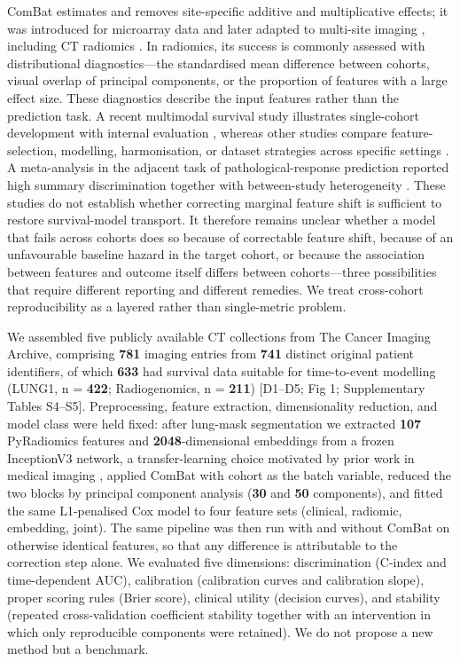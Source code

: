 \documentclass[a4paper,fleqn]{cas-sc}
\begin{document}
ComBat estimates and removes site-specific additive and multiplicative effects; it was introduced for microarray data \citep{johnson2007} and later adapted to multi-site imaging \citep{fortin2018}, including CT radiomics \citep{daano2020,mahon2020,bertolini2022,horng2022,cromb2020}. In radiomics, its success is commonly assessed with distributional diagnostics---the standardised mean difference between cohorts, visual overlap of principal components, or the proportion of features with a large effect size. These diagnostics describe the input features rather than the prediction task. A recent multimodal survival study illustrates single-cohort development with internal evaluation \citep{sahin2026}, whereas other studies compare feature-selection, modelling, harmonisation, or dataset strategies across specific settings \citep{amini2022,ge2023,le2023,chen2022,wang2022,wang2022b}. A meta-analysis in the adjacent task of pathological-response prediction reported high summary discrimination together with between-study heterogeneity \citep{jiang2026}. These studies do not establish whether correcting marginal feature shift is sufficient to restore survival-model transport. It therefore remains unclear whether a model that fails across cohorts does so because of correctable feature shift, because of an unfavourable baseline hazard in the target cohort, or because the association between features and outcome itself differs between cohorts---three possibilities that require different reporting and different remedies. We treat cross-cohort reproducibility as a layered rather than single-metric problem.

We assembled five publicly available CT collections from The Cancer Imaging Archive, comprising \textbf{781} imaging entries from \textbf{741} distinct original patient identifiers, of which \textbf{633} had survival data suitable for time-to-event modelling (LUNG1, n = \textbf{422}; Radiogenomics, n = \textbf{211}) [D1--D5; Fig 1; Supplementary Tables S4--S5]. Preprocessing, feature extraction, dimensionality reduction, and model class were held fixed: after lung-mask segmentation we extracted \textbf{107} PyRadiomics features \citep{vangriethuysen2017} and \textbf{2048}-dimensional embeddings from a frozen InceptionV3 network, a transfer-learning choice motivated by prior work in medical imaging \citep{zhou2021,niu2021,tariq2024,gao2025}, applied ComBat with cohort as the batch variable, reduced the two blocks by principal component analysis (\textbf{30} and \textbf{50} components), and fitted the same L1-penalised Cox model to four feature sets (clinical, radiomic, embedding, joint). The same pipeline was then run with and without ComBat on otherwise identical features, so that any difference is attributable to the correction step alone. We evaluated five dimensions: discrimination (C-index and time-dependent AUC), calibration (calibration curves and calibration slope), proper scoring rules (Brier score), clinical utility (decision curves), and stability (repeated cross-validation coefficient stability together with an intervention in which only reproducible components were retained). We do not propose a new method but a benchmark.
\end{document}
